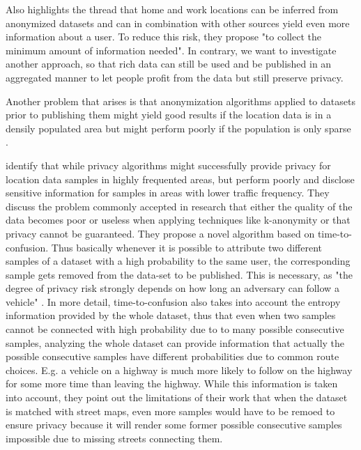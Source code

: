 Also \parencite{privacy-home-work-pairs} highlights the thread that home and work locations can be inferred from anonymized datasets and can in combination with other sources yield even more information about a user. To reduce this risk, they propose "to collect the minimum amount of information needed". In contrary, we want to investigate another approach, so that rich data can still be used and be published in an aggregated manner to let people profit from the data but still preserve privacy.


Another problem that arises is that anonymization algorithms applied to datasets prior to publishing them might yield good results if the location data is in a densily populated area but might perform poorly if the population is only sparse \parencite{time-to-confusion}.

\parencite{time-to-confusion} identify that while privacy algorithms might successfully provide privacy for location data samples in highly frequented areas, but perform poorly and disclose sensitive information for samples in areas with lower traffic frequency. They discuss the problem commonly accepted in research that either the quality of the data becomes poor or useless when applying techniques like k-anonymity \parencite{k-anonymity-old, k-anonymity, k-anonymity-achieving} or that privacy cannot be guaranteed. They propose a novel algorithm based on time-to-confusion. Thus basically whenever it is possible to attribute two different samples of a dataset with a high probability to the same user, the corresponding sample gets removed from the data-set to be published. This is necessary, as "the degree of privacy risk strongly depends on how long an adversary can follow a vehicle" \parencite{time-to-confusion}. In more detail, time-to-confusion also takes into account the entropy information provided by the whole dataset, thus that even when two samples cannot be connected with high probability due to to many possible consecutive samples, analyzing the whole dataset can provide information that actually the possible consecutive samples have different probabilities due to common route choices. E.g. a vehicle on a highway is much more likely to follow on the highway for some more time than leaving the highway. While this information is taken into account, they point out the limitations of their work that when the dataset is matched with street maps, even more samples would have to be remoed to ensure privacy because it will render some former possible consecutive samples impossible due to missing streets connecting them. 

